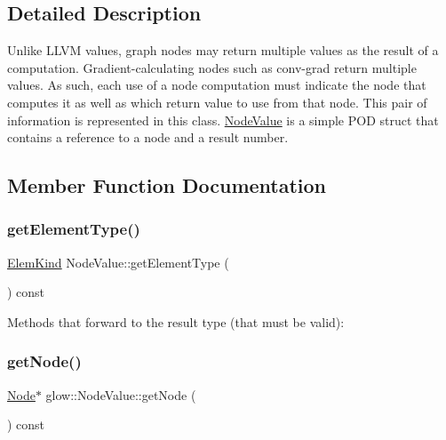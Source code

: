 \subsection{Detailed Description}
Unlike L\+L\+VM values, graph nodes may return multiple values as the result of a computation. Gradient-\/calculating nodes such as conv-\/grad return multiple values. As such, each use of a node computation must indicate the node that computes it as well as which return value to use from that node. This pair of information is represented in this class. \hyperlink{structglow_1_1_node_value}{Node\+Value} is a simple P\+OD struct that contains a reference to a node and a result number. 

\subsection{Member Function Documentation}
\mbox{\label{structglow_1_1_node_value_a44dc07623558f626625ef99f06b98668}} 
\subsubsection{\texorpdfstring{get\+Element\+Type()}{getElementType()}}
{\footnotesize\ttfamily \hyperlink{namespaceglow_ab92e14a94329daf4083db670e95fbcdf}{Elem\+Kind} Node\+Value\+::get\+Element\+Type (\begin{DoxyParamCaption}{ }\end{DoxyParamCaption}) const}

Methods that forward to the result type (that must be valid)\+: \mbox{\label{structglow_1_1_node_value_a3b7a782893423f54d671b17d9dc61b3c}} 
\subsubsection{\texorpdfstring{get\+Node()}{getNode()}}
{\footnotesize\ttfamily \hyperlink{classglow_1_1_node}{Node}$\ast$ glow\+::\+Node\+Value\+::get\+Node (\begin{DoxyParamCaption}{ }\end{DoxyParamCaption}) const\hspace{0.3cm}{\ttfamily [inline]}}

